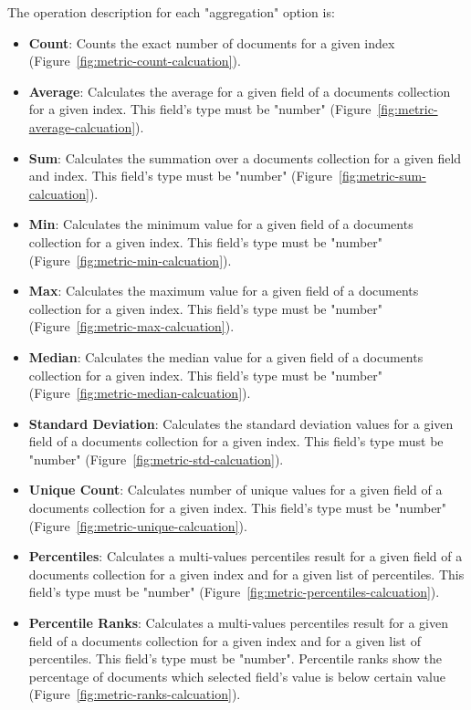 \documentclass[a4paper, 12pt, english]{book}
\begin{document}
The operation description for each "aggregation" option is:
\begin{itemize}
    \item \textbf{Count}: Counts the exact number of documents for a given index (Figure~\ref{fig:metric-count-calcuation}).
    \item \textbf{Average}: Calculates the average for a given field of a documents collection for a given index. This field's type must be "number" (Figure~\ref{fig:metric-average-calcuation}).
    \item \textbf{Sum}: Calculates the summation over a documents collection for a given field and index. This field's type must be "number" (Figure~\ref{fig:metric-sum-calcuation}).
    \item \textbf{Min}: Calculates the minimum value for a given field of a documents collection for a given index. This field's type must be "number" (Figure~\ref{fig:metric-min-calcuation}).
    \item \textbf{Max}: Calculates the maximum value for a given field of a documents collection for a given index. This field's type must be "number" (Figure~\ref{fig:metric-max-calcuation}).
    \item \textbf{Median}: Calculates the median value for a given field of a documents collection for a given index. This field's type must be "number" (Figure~\ref{fig:metric-median-calcuation}).
    \item \textbf{Standard Deviation}: Calculates the standard deviation values for a given field of a documents collection for a given index. This field's type must be "number" (Figure~\ref{fig:metric-std-calcuation}).
    \item \textbf{Unique Count}: Calculates number of unique values for a given field of a documents collection for a given index. This field's type must be "number" (Figure~\ref{fig:metric-unique-calcuation}).
    \item \textbf{Percentiles}: Calculates a multi-values percentiles result for a given field of a documents collection for a given index and for a given list of percentiles. This field's type must be "number" (Figure~\ref{fig:metric-percentiles-calcuation}).
    \item \textbf{Percentile Ranks}: Calculates a multi-values percentiles result for a given field of a documents collection for a given index and for a given list of percentiles. This field's type must be "number". Percentile ranks show the percentage of documents which selected field's value is below certain value (Figure~\ref{fig:metric-ranks-calcuation}).

\end{itemize}
\end{document}
